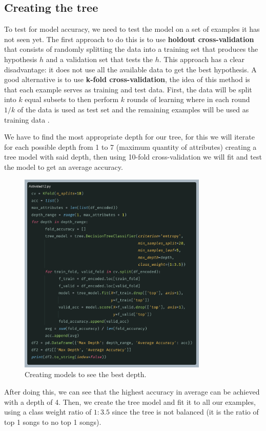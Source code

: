 \documentclass[10pt]{article}
\begin{document}
\subsection{Creating the tree}
To test for model accuracy, we need to test the model on a set of examples it has not seen yet. The first approach to do this is to use \textbf{holdout cross-validation} that consists of randomly splitting the data into a training set that produces the hypothesis $h$ and a validation set that tests the $h$. This approach has a clear disadvantage: it does not use all the available data to get the best hypothesis. A good alternative is to use \textbf{k-fold cross-validation}, the idea of this method is that each example serves as training and test data. First, the data will be split into $k$ equal subsets to then perform $k$ rounds of learning where in each round $1/k$ of the data is used as test set and the remaining examples will be used as training data \cite{ai}. \par
We have to find the most appropriate depth for our tree, for this we will iterate for each possible depth from 1 to 7 (maximum quantity of attributes) creating a tree model with said depth, then using 10-fold cross-validation we will fit and test the model to get an average accuracy. \par
\begin{figure}[h]
    \centering
    \includegraphics[width=90mm]{2025-03-31-07-38-26.png}
    \caption{Creating models to see the best depth.}
\end{figure}
After doing this, we can see that the highest accuracy in average can be achieved with a depth of 4. Then, we create the tree model and fit it to all our examples, using a class weight ratio of $1:3.5$ since the tree is not balanced (it is the ratio of top 1 songs to no top 1 songs). \par
\end{document}
